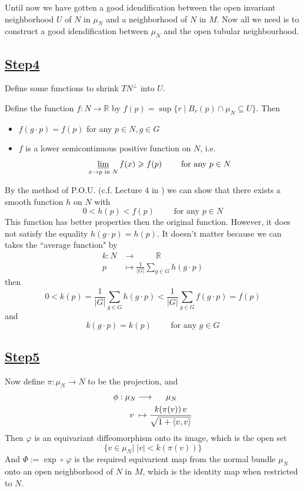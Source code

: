 \documentclass[reqno,11pt]{amsart}
\numberwithin{equation}{section}
\theoremstyle{plain}
\theoremstyle{plain}
\numberwithin{equation}{section}
\theoremstyle{remark}
\begin{document}
Until now we have gotten a good idendification between the open invariant neighborhood $U$ of $N$ in $\mu_N$ and a neighborhood of $N$ in $M$. Now all we need is to construct a good idendification between $\mu_N$ and the open tubular neighbourhood.
\subsection*{\underline{Step4}} Define some functions to shrink $TN^{\perp}$ into $U$.

Define the function
$f:N \rightarrow \mathbb{R}$ by
$f(p) = \sup\{r\mid B_r(p) \cap \mu_N \subseteq U\} $. Then 
\begin{itemize}
	\item $f(g\cdot p)=f(p)$ for any $p \in N, g \in G$\label{item:sym}
	\item $f$ is a lower semicontinuous positive function on $N$, i.e.
	$$\varliminf_{x\rightarrow p \text{ in } N}f(x) \geqslant f(p) \qquad \text{ for any }p \in N$$
\end{itemize}
By the method of P.O.U. (c.f. Lecture 4 in \cite{ZW1}) we can show that there exists a smooth function $h$ on $N$ with
$$0<h(p)<f(p) \qquad \text{ for any }p \in N$$
This function has better properties then the original function. However, it does not satisfy the equality $h(g\cdot p)=h(p)$. It doesn't matter because we can takes the ``average function" by
\begin{equation}
\begin{aligned}
	k:N&\longrightarrow\hspace{1cm} \mathbb{R}\\
	p\;&\mapsto \frac{1}{|G|}\sum_{g \in G} h(g \cdot p)
	\label{eq:aver}
\end{aligned}
\end{equation}
then $$0<k(p)=\frac{1}{|G|}\sum_{g \in G} h(g \cdot p)<\frac{1}{|G|}\sum_{g \in G} f(g \cdot p)=f(p)$$
and $$k(g\cdot p)=k(p)\qquad \text{ for any }g \in G$$

\subsection*{\underline{Step5}}
Now define $\pi:\mu_N \rightarrow N$ to be the projection, and 
\begin{equation*}
\begin{aligned}
\phi:\mu_N&\longrightarrow\hspace{0.5cm} \mu_N\\
v\;&\mapsto \frac{k(\pi(v)) \, v}{\sqrt{1+\left<v,v\right>}}
\end{aligned}
\end{equation*}
Then $\varphi$ is an equivariant diffeomorphism
onto its image, which is the open set $$\{v \in \mu_N \big|\; |v|<k(\pi(v))\}$$
And $\Phi\!:=\!\exp \circ\, \varphi$ is the required equivarient map from the normal bundle $\mu_N$ onto an open neighborhood of $N$ in $M$, which is the identity map when restricted to $N$.
\end{document}
